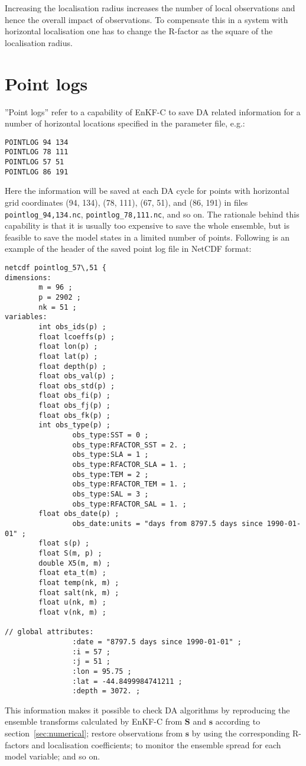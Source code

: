 \documentclass[11pt]{report}
\newcommand{\mb} {\mathbf}
\begin{document}
Increasing the localisation radius increases the number of local observations and hence the overall impact of observations.
To compensate this in a system with horizontal localisation one has to change the R-factor as the square of the localisation radius.

\section{Point logs}

''Point logs'' refer to a capability of EnKF-C to save DA related information for a number of horizontal locations specified in the parameter file, e.g.:
\begin{Verbatim}[frame=single,fontsize=\footnotesize]
POINTLOG 94 134
POINTLOG 78 111
POINTLOG 57 51
POINTLOG 86 191
\end{Verbatim}
Here the information will be saved at each DA cycle for points with horizontal grid coordinates (94, 134), (78, 111), (67, 51), and (86, 191) in files \verb|pointlog_94,134.nc|, \verb|pointlog_78,111.nc|, and so on.
The rationale behind this capability is that it is usually too expensive to save the whole ensemble, but is feasible to save the model states in a limited number of points.
Following is an example of the header of the saved point log file in NetCDF format:
\begin{Verbatim}[frame=single,fontsize=\footnotesize]
netcdf pointlog_57\,51 {
dimensions:
        m = 96 ;
        p = 2902 ;
        nk = 51 ;
variables:
        int obs_ids(p) ;
        float lcoeffs(p) ;
        float lon(p) ;
        float lat(p) ;
        float depth(p) ;
        float obs_val(p) ;
        float obs_std(p) ;
        float obs_fi(p) ;
        float obs_fj(p) ;
        float obs_fk(p) ;
        int obs_type(p) ;
                obs_type:SST = 0 ;
                obs_type:RFACTOR_SST = 2. ;
                obs_type:SLA = 1 ;
                obs_type:RFACTOR_SLA = 1. ;
                obs_type:TEM = 2 ;
                obs_type:RFACTOR_TEM = 1. ;
                obs_type:SAL = 3 ;
                obs_type:RFACTOR_SAL = 1. ;
        float obs_date(p) ;
                obs_date:units = "days from 8797.5 days since 1990-01-01" ;
        float s(p) ;
        float S(m, p) ;
        double X5(m, m) ;
        float eta_t(m) ;
        float temp(nk, m) ;
        float salt(nk, m) ;
        float u(nk, m) ;
        float v(nk, m) ;

// global attributes:
                :date = "8797.5 days since 1990-01-01" ;
                :i = 57 ;
                :j = 51 ;
                :lon = 95.75 ;
                :lat = -44.8499984741211 ;
                :depth = 3072. ;
\end{Verbatim}
This information makes it possible to check DA algorithms by reproducing the ensemble transforms calculated by EnKF-C from $\mb S$ and $\mb s$ according to section~\ref{sec:numerical}; restore observations from $\mb s$ by using the corresponding R-factors and localisation coefficients; to monitor the ensemble spread for each model variable; and so on.
\end{document}
